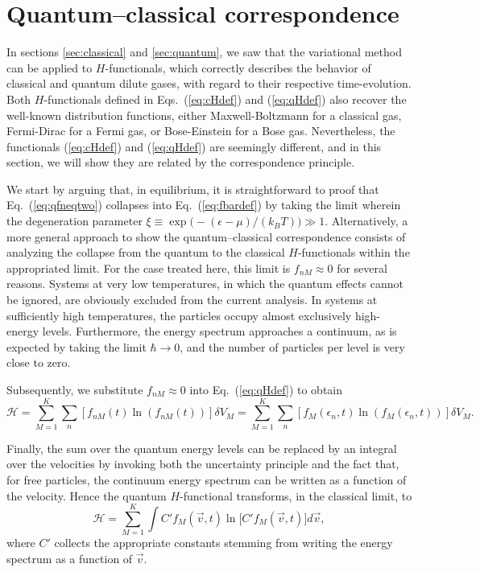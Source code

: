 \section{Quantum–classical correspondence}\label{sec:qccorrespondence}

In sections \ref{sec:classical} and \ref{sec:quantum}, we saw that the variational
method can be applied to $H$-functionals, which correctly describes the behavior of
classical and quantum dilute gases, with regard to their respective time-evolution.
Both $H$-functionals defined in Eqs.~(\ref{eq:cHdef}) and
(\ref{eq:qHdef}) also recover the well-known distribution functions, either Maxwell-Boltzmann
for a classical gas, Fermi-Dirac for a Fermi gas, or Bose-Einstein for a Bose gas. Nevertheless,
the functionals (\ref{eq:cHdef}) and
(\ref{eq:qHdef}) are seemingly different, and in this section, we will show they are
related by the correspondence principle.

We start by arguing that, in equilibrium, it is straightforward to proof that
Eq.~(\ref{eq:qfneqtwo}) collapses
into Eq.~(\ref{eq:fbardef}) by taking the limit wherein the 
degeneration parameter $\xi\equiv\exp\big(-(\epsilon-\mu)/(k_BT)\big) \gg 1$.
Alternatively, a more general approach to show the quantum–classical correspondence
consists of analyzing the collapse from the quantum to the classical $H$-functionals
within the appropriated limit.
For the case treated here, this limit is $f_{nM} \approx 0$ for several reasons.
Systems at very low temperatures, in which the quantum effects cannot be ignored, are obviously excluded
from the current analysis. In systems at sufficiently high temperatures, the particles
occupy almost exclusively high-energy levels. 
Furthermore, the energy spectrum approaches a continuum, as is expected by taking the limit
$\hbar\to0$, and the number of particles per level is very close to zero.

Subsequently, we substitute $f_{nM}\approx0$ into Eq.~(\ref{eq:qHdef}) to obtain
%
\begin{equation}\label{h-quantic2}
    \mathcal{H}= \sum_{M=1}^{K} \sum_n
    \left[ f_{nM}(t)\ln \left(f_{nM}(t)\right)\right] \delta V_M
    =\sum_{M=1}^{K} \sum_n
    \left[ f_{M}(\epsilon_n,t) \ln \left( f_{M}(\epsilon_n,t)\right)\right] \delta V_M.
\end{equation}
%

Finally, the sum over the quantum energy levels can be replaced by an integral over the velocities
by invoking both the uncertainty principle and the fact that, for free particles, the continuum
energy spectrum
can be written as a function of the velocity. Hence the quantum $H$-functional
transforms, in the classical limit, to
%
\begin{equation}\label{eq:qHclassLim}
    \mathcal{H}= \sum_{M=1}^{K}\int C'f_M(\vec v,t)\ln\big[C' f_M(\vec v,t)\big] d\vec v,
\end{equation}
%
where $C'$ collects the appropriate constants stemming from writing the energy spectrum as
a function of $\vec v$.


